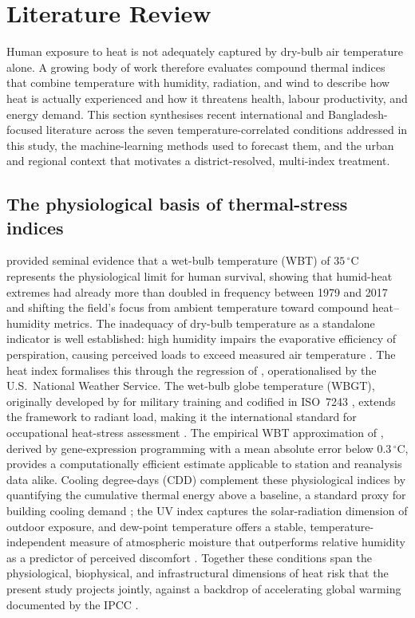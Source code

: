\documentclass[pdflatex,sn-basic,lineno]{sn-jnl}
\newcommand{\degC}{\ensuremath{^{\circ}\mathrm{C}}}
\begin{document}
\section{Literature Review}\label{sec:litreview}

Human exposure to heat is not adequately captured by dry-bulb air temperature
alone. A growing body of work therefore evaluates compound thermal indices that
combine temperature with humidity, radiation, and wind to describe how heat is
actually experienced and how it threatens health, labour productivity, and energy
demand. This section synthesises recent international and Bangladesh-focused
literature across the seven temperature-correlated conditions addressed in this
study, the machine-learning methods used to forecast them, and the urban and
regional context that motivates a district-resolved, multi-index treatment.

\subsection{The physiological basis of thermal-stress indices}
\citet{raymond2020} provided seminal evidence that a wet-bulb temperature (WBT)
of $35\,\degC$ represents the physiological limit for human survival, showing that
humid-heat extremes had already more than doubled in frequency between 1979 and
2017 and shifting the field's focus from ambient temperature toward compound
heat--humidity metrics. The inadequacy of dry-bulb temperature as a standalone
indicator is well established: high humidity impairs the evaporative efficiency of
perspiration, causing perceived loads to exceed measured air temperature
\citep{steadman1979}. The heat index formalises this through the regression of
\citet{rothfusz1990}, operationalised by the U.S.\ National Weather Service. The
wet-bulb globe temperature (WBGT), originally developed by \citet{yaglou1957} for
military training and codified in ISO~7243 \citep{iso7243_2017}, extends the
framework to radiant load, making it the international standard for occupational
heat-stress assessment \citep{parsons2006}. The empirical WBT approximation of
\citet{stull2011}, derived by gene-expression programming with a mean absolute
error below $0.3\,\degC$, provides a computationally efficient estimate applicable
to station and reanalysis data alike. Cooling degree-days (CDD) complement these
physiological indices by quantifying the cumulative thermal energy above a
baseline, a standard proxy for building cooling demand \citep{spinoni2018,
bhatnagar2018}; the UV index \citep{who2002} captures the solar-radiation
dimension of outdoor exposure, and dew-point temperature offers a stable,
temperature-independent measure of atmospheric moisture that outperforms relative
humidity as a predictor of perceived discomfort \citep{lawrence2005}. Together
these conditions span the physiological, biophysical, and infrastructural
dimensions of heat risk that the present study projects jointly, against a
backdrop of accelerating global warming documented by the IPCC \citep{ipcc2022ar6}.
\end{document}
